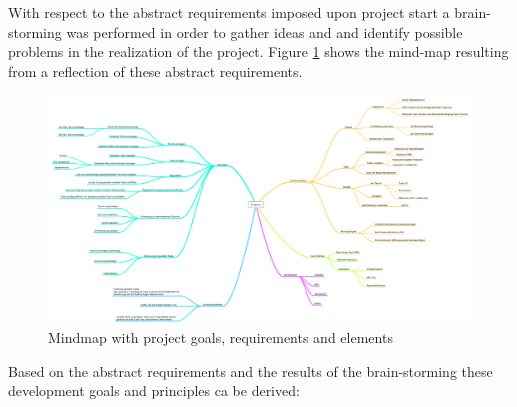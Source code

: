 With respect to the abstract requirements imposed upon project start a brain-storming was performed in order to gather ideas and and identify possible problems in the realization of the project. Figure \ref{mindmap} shows the mind-map resulting from a reflection of these abstract requirements. 
\begin{figure}[h!]
\centering
\includegraphics[width=16cm]{pics/kangaroo.png}
\caption{Mindmap with project goals, requirements and elements}
\label{mindmap}                                                                                                                                                  
\end{figure}
Based on the abstract requirements and the results of the brain-storming these development goals and principles ca be derived:

